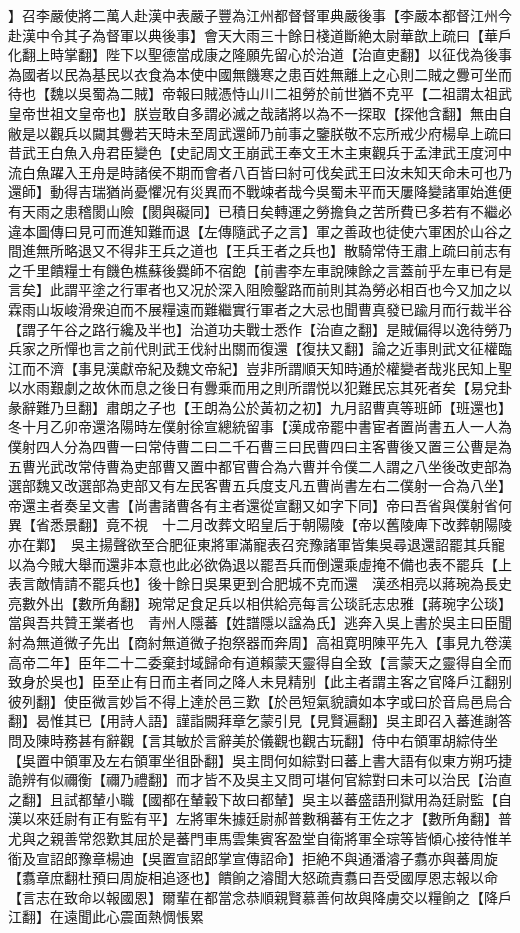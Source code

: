 】召李嚴使將二萬人赴漢中表嚴子豐為江州都督督軍典嚴後事【李嚴本都督江州今赴漢中令其子為督軍以典後事】會天大雨三十餘日棧道斷絶太尉華歆上疏曰【華戶化翻上時掌翻】陛下以聖德當成康之隆願先留心於治道【治直吏翻】以征伐為後事為國者以民為基民以衣食為本使中國無饑寒之患百姓無離上之心則二賊之釁可坐而待也【魏以吳蜀為二賊】帝報曰賊憑恃山川二祖勞於前世猶不克平【二祖謂太祖武皇帝世祖文皇帝也】朕豈敢自多謂必滅之哉諸將以為不一探取【探他含翻】無由自敝是以觀兵以闚其釁若天時未至周武還師乃前事之鑒朕敬不忘所戒少府楊阜上疏曰昔武王白魚入舟君臣變色【史記周文王崩武王奉文王木主東觀兵于孟津武王度河中流白魚躍入王舟是時諸侯不期而會者八百皆曰紂可伐矣武王曰汝未知天命未可也乃還師】動得吉瑞猶尚憂懼况有災異而不戰竦者哉今吳蜀未平而天屢降變諸軍始進便有天雨之患稽閡山險【閡與礙同】已積日矣轉運之勞擔負之苦所費已多若有不繼必違本圖傳曰見可而進知難而退【左傳隨武子之言】軍之善政也徒使六軍困於山谷之間進無所略退又不得非王兵之道也【王兵王者之兵也】散騎常侍王肅上疏曰前志有之千里饋糧士有饑色樵蘇後爨師不宿飽【前書李左車說陳餘之言蓋前乎左車已有是言矣】此謂平塗之行軍者也又况於深入阻險鑿路而前則其為勞必相百也今又加之以霖雨山坂峻滑衆迫而不展糧遠而難繼實行軍者之大忌也聞曹真發已踰月而行裁半谷【謂子午谷之路行纔及半也】治道功夫戰士悉作【治直之翻】是賊偏得以逸待勞乃兵家之所憚也言之前代則武王伐紂出關而復還【復扶又翻】論之近事則武文征權臨江而不濟【事見漢獻帝紀及魏文帝紀】豈非所謂順天知時通於權變者哉兆民知上聖以水雨艱劇之故休而息之後日有釁乘而用之則所謂悦以犯難民忘其死者矣【易兌卦彖辭難乃旦翻】肅朗之子也【王朗為公於黃初之初】九月詔曹真等班師【班還也】　冬十月乙卯帝還洛陽時左僕射徐宣總統留事【漢成帝罷中書宦者置尚書五人一人為僕射四人分為四曹一曰常侍曹二曰二千石曹三曰民曹四曰主客曹後又置三公曹是為五曹光武改常侍曹為吏部曹又置中都官曹合為六曹并令僕二人謂之八坐後改吏部為選部魏又改選部為吏部又有左民客曹五兵度支凡五曹尚書左右二僕射一合為八坐】帝還主者奏呈文書【尚書諸曹各有主者還從宣翻又如字下同】帝曰吾省與僕射省何異【省悉景翻】竟不視　十二月改葬文昭皇后于朝陽陵【帝以舊陵庳下改葬朝陽陵亦在鄴】　吳主揚聲欲至合肥征東將軍滿寵表召兖豫諸軍皆集吳尋退還詔罷其兵寵以為今賊大舉而還非本意也此必欲偽退以罷吾兵而倒還乘虛掩不備也表不罷兵【上表言敵情請不罷兵也】後十餘日吳果更到合肥城不克而還　漢丞相亮以蔣琬為長史亮數外出【數所角翻】琬常足食足兵以相供給亮每言公琰託志忠雅【蔣琬字公琰】當與吾共贊王業者也　青州人隱蕃【姓譜隱以諡為氏】逃奔入吳上書於吳主曰臣聞紂為無道微子先出【商紂無道微子抱祭器而奔周】高祖寛明陳平先入【事見九卷漢高帝二年】臣年二十二委棄封域歸命有道賴蒙天靈得自全致【言蒙天之靈得自全而致身於吳也】臣至止有日而主者同之降人未見精别【此主者謂主客之官降戶江翻别彼列翻】使臣微言妙旨不得上達於邑三歎【於邑短氣貌讀如本字或曰於音烏邑烏合翻】曷惟其已【用詩人語】謹詣闕拜章乞蒙引見【見賢遍翻】吳主即召入蕃進謝答問及陳時務甚有辭觀【言其敏於言辭美於儀觀也觀古玩翻】侍中右領軍胡綜侍坐【吳置中領軍及左右領軍坐徂卧翻】吳主問何如綜對曰蕃上書大語有似東方朔巧捷詭辨有似禰衡【禰乃禮翻】而才皆不及吳主又問可堪何官綜對曰未可以治民【治直之翻】且試都輦小職【國都在輦轂下故曰都輦】吳主以蕃盛語刑獄用為廷尉監【自漢以來廷尉有正有監有平】左將軍朱據廷尉郝普數稱蕃有王佐之才【數所角翻】普尤與之親善常怨歎其屈於是蕃門車馬雲集賓客盈堂自衛將軍全琮等皆傾心接待惟羊衜及宣詔郎豫章楊迪【吳置宣詔郎掌宣傳詔命】拒絶不與通潘濬子翥亦與蕃周旋【翥章庶翻杜預曰周旋相追逐也】饋餉之濬聞大怒疏責翥曰吾受國厚恩志報以命【言志在致命以報國恩】爾輩在都當念恭順親賢慕善何故與降虜交以糧餉之【降戶江翻】在遠聞此心震面熱惆悵累